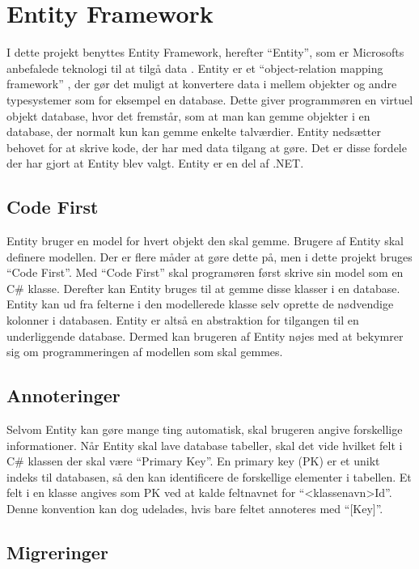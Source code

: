 \section{Entity Framework}
\label{sec:entity}
I dette projekt benyttes Entity Framework, herefter \enquote{Entity}, som er Microsofts anbefalede teknologi til at tilgå data \cite{entity}. Entity er et \enquote{object-relation mapping framework} \cite{lerman2010programming}, der gør det muligt at konvertere data i mellem objekter og andre typesystemer som for eksempel en database. Dette giver programmøren en virtuel objekt database, hvor det fremstår, som at man kan gemme objekter i en database, der normalt kun kan gemme enkelte talværdier. Entity nedsætter behovet for at skrive kode, der har med data tilgang at gøre. Det er disse fordele der har gjort at Entity blev valgt. Entity er en del af .NET.


\subsection{Code First}
\label{sub:code_first}
Entity bruger en model for hvert objekt den skal gemme. Brugere af Entity skal definere modellen. Der er flere måder at gøre dette på, men i dette projekt bruges \enquote{Code First}. Med \enquote{Code First} skal programøren først skrive sin model som en C\# klasse. Derefter kan Entity bruges til at gemme disse klasser i en database. Entity kan ud fra felterne i den modellerede klasse selv oprette de nødvendige kolonner i databasen. Entity er altså en abstraktion for tilgangen til en underliggende database. Dermed kan brugeren af Entity nøjes med at bekymrer sig om programmeringen af modellen som skal gemmes.

\subsection{Annoteringer}
\label{sub:annoteringer}
Selvom Entity kan gøre mange ting automatisk, skal brugeren angive forskellige informationer. Når Entity skal lave database tabeller, skal det vide hvilket felt i C\# klassen der skal være \enquote{Primary Key}. En primary key (PK) er et unikt indeks til databasen, så den kan identificere de forskellige elementer i tabellen. Et felt i en klasse angives som PK ved at kalde feltnavnet for \enquote{<klassenavn>Id}. Denne konvention kan dog udelades, hvis bare feltet annoteres med \enquote{[Key]}.

\subsection{Migreringer}
\label{sub:migreringer}

